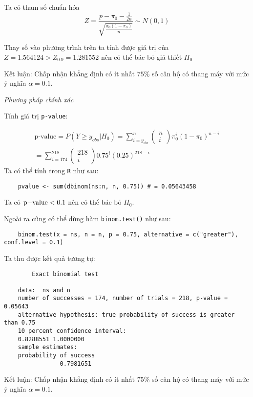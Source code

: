 Ta có tham số chuẩn hóa 
$$Z = \frac{p - \pi_0 - \frac{1}{2n}}{\sqrt{\frac{\pi_0(1 - \pi_0)}{n}}} \sim N(0, 1)$$

Thay số vào phương trình trên ta tính được giá trị của $Z = 1.564124 > Z_{0.9} = 1.281552$
nên có thể bác bỏ giả thiết $H_0$

Kết luận: Chấp nhận khẳng định có ít nhất $75\%$ số căn hộ có thang máy với mức ý nghĩa $\alpha = 0.1$.

\textit{Phương pháp chính xác}

Tính giá trị \lstinline{p-value}:

\begin{align*}
    \text{p-value} = P(Y \geqslant y_{obs} | H_0) = \sum_{i = y_{obs}}^{n}\begin{pmatrix}
        n \\ i
    \end{pmatrix} \pi_0^i(1 - \pi_0)^{n - i} \\
    = \sum_{i = 174}^{218} \begin{pmatrix}
        218 \\ i
    \end{pmatrix} 0.75^i (0.25)^{218-i}
\end{align*}
Ta có thể tính trong \lstinline{R} như sau:

\begin{lstlisting}
    pvalue <- sum(dbinom(ns:n, n, 0.75)) # = 0.05643458
\end{lstlisting}

Ta có $\text{\lstinline{p-value}} < 0.1$ nên có thể bác bỏ $H_0$.

Ngoài ra cũng có thể dùng hàm \lstinline{binom.test()} như sau:

\begin{lstlisting}
    binom.test(x = ns, n = n, p = 0.75, alternative = c("greater"), conf.level = 0.1)
\end{lstlisting}

Ta thu được kết quả tương tự:

\begin{lstlisting}
        Exact binomial test

    data:  ns and n
    number of successes = 174, number of trials = 218, p-value = 0.05643
    alternative hypothesis: true probability of success is greater than 0.75
    10 percent confidence interval:
    0.8288551 1.0000000
    sample estimates:
    probability of success 
                0.7981651 
\end{lstlisting}

Kết luận: Chấp nhận khẳng định có ít nhất $75\%$ số căn hộ có thang máy với mức ý nghĩa $\alpha = 0.1$.